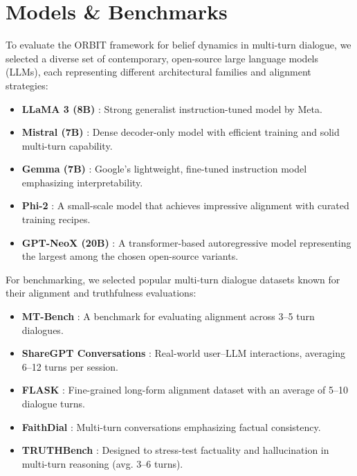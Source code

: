 \documentclass[11pt]{article}
\begin{document}
\section{Models \& Benchmarks}

To evaluate the ORBIT framework for belief dynamics in multi-turn dialogue, we selected a diverse set of contemporary, open-source large language models (LLMs), each representing different architectural families and alignment strategies:

\begin{itemize}
    \item \textbf{LLaMA 3 (8B)} \cite{touvron2024llama}: Strong generalist instruction-tuned model by Meta.
    \item \textbf{Mistral (7B)} \cite{jiang2023mistral}: Dense decoder-only model with efficient training and solid multi-turn capability.
    \item \textbf{Gemma (7B)} \cite{anil2023gemma}: Google's lightweight, fine-tuned instruction model emphasizing interpretability.
    \item \textbf{Phi-2} \cite{gunasekar2023phi}: A small-scale model that achieves impressive alignment with curated training recipes.
    \item \textbf{GPT-NeoX (20B)} \cite{black2022gpt}: A transformer-based autoregressive model representing the largest among the chosen open-source variants.
\end{itemize}

For benchmarking, we selected popular multi-turn dialogue datasets known for their alignment and truthfulness evaluations:

\begin{itemize}
    \item \textbf{MT-Bench} \cite{zheng2023judging}: A benchmark for evaluating alignment across 3–5 turn dialogues.
    \item \textbf{ShareGPT Conversations} \cite{sharegpt2023}: Real-world user–LLM interactions, averaging 6–12 turns per session.
    \item \textbf{FLASK} \cite{liang2023flask}: Fine-grained long-form alignment dataset with an average of 5–10 dialogue turns.
    \item \textbf{FaithDial} \cite{dziri2022faithdial}: Multi-turn conversations emphasizing factual consistency.
    \item \textbf{TRUTHBench} \cite{pang2023truthbench}: Designed to stress-test factuality and hallucination in multi-turn reasoning (avg. 3–6 turns).
\end{itemize}
\end{document}
